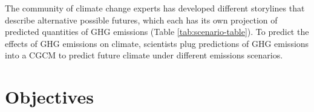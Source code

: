 \documentclass[]{book}
\begin{document}
The community of climate change experts has developed different storylines that describe alternative possible futures, which each has its own projection of predicted quantities of GHG emissions (Table \ref{tab:scenario-table}). To predict the effects of GHG emissions on climate, scientists plug predictions of GHG emissions into a CGCM to predict future climate under different emissions scenarios.

\begin{table}[t]

\caption{\label{tab:scenario-table}Characteristics of selected emissions scenarios from the Intergovernmental Panel on Climate Change. These scenarios represent alternative possibilities for future social and technological change as envisioned by a collaboration of governmental and non-governmental analysts.}
\centering
{}
\end{table}

\hypertarget{objectives-5}{%
\section{Objectives}\label{objectives-5}}
\end{document}
